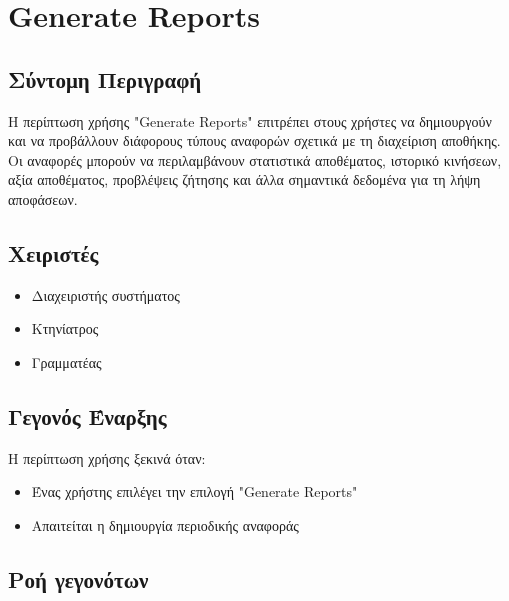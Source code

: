 \documentclass[12pt,a4paper,twoside]{book}
\begin{document}
\section{Generate Reports}

\subsection{Σύντομη Περιγραφή}
Η περίπτωση χρήσης "Generate Reports" επιτρέπει στους χρήστες να δημιουργούν και να προβάλλουν διάφορους τύπους αναφορών σχετικά με τη διαχείριση αποθήκης. Οι αναφορές μπορούν να περιλαμβάνουν στατιστικά αποθέματος, ιστορικό κινήσεων, αξία αποθέματος, προβλέψεις ζήτησης και άλλα σημαντικά δεδομένα για τη λήψη αποφάσεων. %

\subsection{Χειριστές}
\begin{itemize}
  \item Διαχειριστής συστήματος
  \item Κτηνίατρος
  \item Γραμματέας
\end{itemize}

\subsection{Γεγονός Έναρξης}
Η περίπτωση χρήσης ξεκινά όταν:
\begin{itemize}
  \item Ένας χρήστης επιλέγει την επιλογή "Generate Reports" %
  \item Απαιτείται η δημιουργία περιοδικής αναφοράς
\end{itemize}

\subsection{Ροή γεγονότων}
\end{document}
